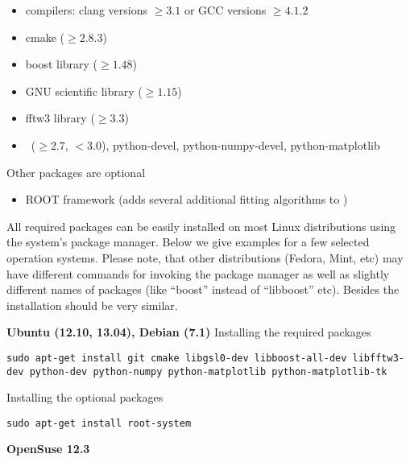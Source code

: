 \begin{itemize}
\item compilers: clang  versions $\geq 3.1$ or GCC versions $\geq 4.1.2$
\item cmake ($\geq 2.8.3$)
\item boost library ($\geq 1.48$)
\item GNU scientific library ($\geq 1.15$)
\item fftw3 library ($\geq 3.3$)
\item \Python\ ($\geq 2.7$, $< 3.0$), python-devel, python-numpy-devel, python-matplotlib
\end{itemize}
\vspace*{2mm}

Other packages are optional
\begin{itemize}
\item ROOT framework (adds several additional fitting algorithms to \BornAgain)
\end{itemize}

All required packages can be easily installed on most Linux distributions using the system's package
manager. Below we give examples for a few selected operation systems. Please note,
that other distributions (Fedora, Mint, etc) may have different
commands for invoking the package manager as well as slightly different names of packages (like ``boost'' instead of ``libboost'' etc). Besides  the installation should be very similar.
\vspace*{3mm}


\noindent
{\large\bf Ubuntu (12.10, 13.04), Debian (7.1)} \newline
Installing the required packages
\begin{lstlisting}[language=shell, style=commandline]
sudo apt-get install git cmake libgsl0-dev libboost-all-dev libfftw3-dev python-dev python-numpy python-matplotlib python-matplotlib-tk
\end{lstlisting}

\noindent
Installing the optional packages
\begin{lstlisting}[language=shell, style=commandline]
sudo apt-get install root-system
\end{lstlisting}
\vspace*{3mm}


\noindent
{\large\bf OpenSuse 12.3} \newline

